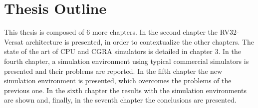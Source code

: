 \section{Thesis Outline}
\label{section:outline}

This thesis is composed of 6 more chapters. In the second chapter the
RV32-Versat architecture is presented, in order to contextualize the other
chapters. The state of the art of \ac{CPU} and \ac{CGRA} simulators is detailed
in chapter 3. In the fourth chapter, a simulation environment using typical
commercial simulators is presented and their problems are reported. In the fifth
chapter the new simulation environment is presented, which overcomes the
problems of the previous one. In the sixth chapter the results with the
simulation environments are shown and, finally, in the seventh chapter the
conclusions are presented.

